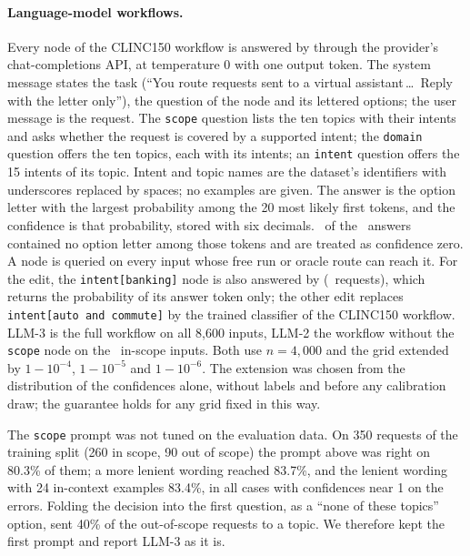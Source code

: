 \paragraph{Language-model workflows.}\label{app:llm}
Every node of the CLINC150 workflow is answered by \texttt{\LlmModel} through the provider's
chat-completions API, at temperature 0 with one output token. The system message states the
task (``You route requests sent to a virtual assistant\,\dots\ Reply with the letter only''),
the question of the node and its lettered options; the user message is the request. The
\texttt{scope} question lists the ten topics with their intents and asks whether the request
is covered by a supported intent; the \texttt{domain} question offers the ten topics, each
with its intents; an \texttt{intent} question offers the 15 intents of its topic. Intent and
topic names are the dataset's identifiers with underscores replaced by spaces; no examples
are given. The answer is the option letter with the largest probability among the 20 most
likely first tokens, and the confidence is that probability, stored with six decimals.
\LlmUnparsed\ of the \LlmRequests\ answers contained no option letter among those tokens and
are treated as confidence zero. A node is queried on every input whose free run or oracle
route can reach it. For the edit, the \texttt{intent[banking]} node is also answered by
\texttt{\LlmUpgrade} (\LlmUpgradeRequests\ requests), which returns the probability of its
answer token only; the other edit replaces \texttt{intent[auto and commute]} by the trained
classifier of the CLINC150 workflow. LLM-3 is the full workflow on all 8{,}600 inputs, LLM-2
the workflow without the \texttt{scope} node on the \LlmSizeL\ in-scope inputs. Both use
$n=4{,}000$ and the grid extended by $1-10^{-4}$, $1-10^{-5}$ and $1-10^{-6}$. The extension
was chosen from the distribution of the confidences alone, without labels and before any
calibration draw; the guarantee holds for any grid fixed in this way.

The \texttt{scope} prompt was not tuned on the evaluation data. On 350 requests of the
training split (260 in scope, 90 out of scope) the prompt above was right on 80.3\% of them;
a more lenient wording reached 83.7\%, and the lenient wording with 24 in-context examples
83.4\%, in all cases with confidences near 1 on the errors. Folding the decision into the
first question, as a ``none of these topics'' option, sent 40\% of the out-of-scope requests
to a topic. We therefore kept the first prompt and report LLM-3 as it is.

